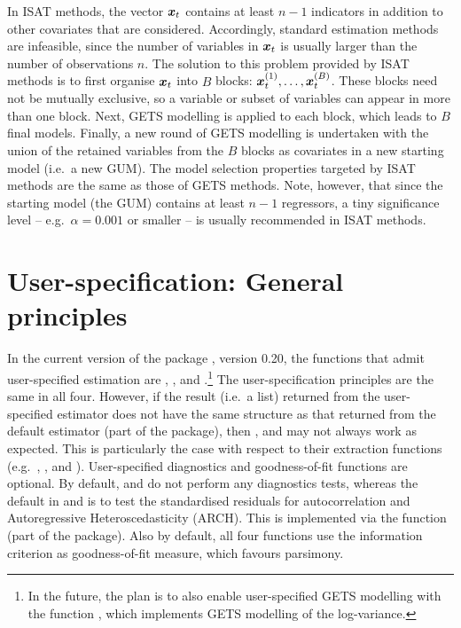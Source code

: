 In ISAT methods, the vector $\boldsymbol{x}_t$ contains at least $n-1$ indicators in addition to other covariates that are considered. Accordingly, standard estimation methods are infeasible, since the number of variables in $\boldsymbol{x}_t$ is usually larger than the number of observations $n$. The solution to this problem provided by ISAT methods is to first organise $\boldsymbol{x}_t$ into $B$ blocks: $\boldsymbol{x}_t^{(1)}, \ldots, \boldsymbol{x}_t^{(B)}$. These blocks need not be mutually exclusive, so a variable or subset of variables can appear in more than one block. Next, GETS modelling is applied to each block, which leads to $B$ final models. Finally, a new round of GETS modelling is undertaken with the union of the retained variables from the $B$ blocks as covariates in a new starting model (i.e.\ a new GUM). The model selection properties targeted by ISAT methods are the same as those of GETS methods. Note, however, that since the starting model (the GUM) contains at least $n-1$ regressors, a tiny significance level -- e.g.\ $\alpha=0.001$ or smaller -- is usually recommended in ISAT methods.

\section{User-specification: General principles} 

In the current version of the package , version 0.20, the functions that admit user-specified estimation are , ,  and .\footnote{In the future, the plan is to also enable user-specified GETS modelling with the function , which implements GETS modelling of the log-variance.} The user-specification principles are the same in all four. However, if the result (i.e.\ a list) returned from the user-specified estimator does not have the same structure as that returned from the default estimator  (part of the  package), then ,  and  may not always work as expected. This is particularly the case with respect to their extraction functions (e.g.\ , ,  and ). User-specified diagnostics and goodness-of-fit functions are optional. By default,  and  do not perform any diagnostics tests, whereas the default in  and  is to test the standardised residuals for autocorrelation and Autoregressive Heteroscedasticity (ARCH). This is implemented via the  function (part of the  package). Also by default, all four 
functions use the \cite{Schwarz1978} information criterion as goodness-of-fit measure, which favours parsimony.

